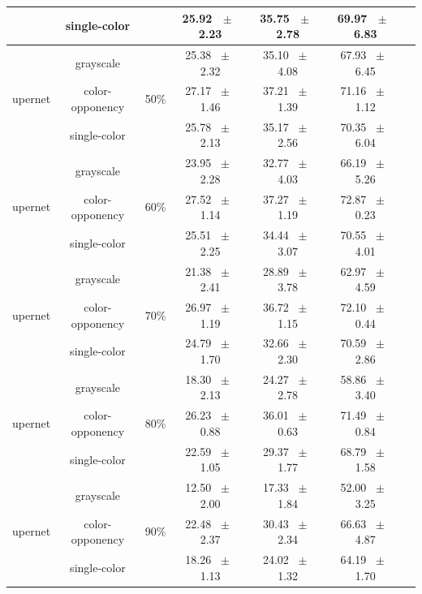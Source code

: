 \begin{table}[h]
\begin{tabular}{@{}lccc ccc@{}}
    & single-color &  & 25.92 ~$\pm$~ 2.23 & 35.75 ~$\pm$~ 2.78 & 69.97 ~$\pm$~ 6.83 \\
    \midrule
    \multirow{3}{*}{upernet} & grayscale & \multirow{3}{*}{50\%} & 25.38 ~$\pm$~ 2.32 & 35.10 ~$\pm$~ 4.08 & 67.93 ~$\pm$~ 6.45 \\
    & color-opponency &  & 27.17 ~$\pm$~ 1.46 & 37.21 ~$\pm$~ 1.39 & 71.16 ~$\pm$~ 1.12 \\
    & single-color &  & 25.78 ~$\pm$~ 2.13 & 35.17 ~$\pm$~ 2.56 & 70.35 ~$\pm$~ 6.04 \\
    \midrule
    \multirow{3}{*}{upernet} & grayscale & \multirow{3}{*}{60\%} & 23.95 ~$\pm$~ 2.28 & 32.77 ~$\pm$~ 4.03 & 66.19 ~$\pm$~ 5.26 \\
    & color-opponency &  & 27.52 ~$\pm$~ 1.14 & 37.27 ~$\pm$~ 1.19 & 72.87 ~$\pm$~ 0.23 \\
    & single-color &  & 25.51 ~$\pm$~ 2.25 & 34.44 ~$\pm$~ 3.07 & 70.55 ~$\pm$~ 4.01 \\
    \midrule
    \multirow{3}{*}{upernet} & grayscale & \multirow{3}{*}{70\%} & 21.38 ~$\pm$~ 2.41 & 28.89 ~$\pm$~ 3.78 & 62.97 ~$\pm$~ 4.59 \\
    & color-opponency &  & 26.97 ~$\pm$~ 1.19 & 36.72 ~$\pm$~ 1.15 & 72.10 ~$\pm$~ 0.44 \\
    & single-color &  & 24.79 ~$\pm$~ 1.70 & 32.66 ~$\pm$~ 2.30 & 70.59 ~$\pm$~ 2.86 \\
    \midrule
    \multirow{3}{*}{upernet} & grayscale & \multirow{3}{*}{80\%} & 18.30 ~$\pm$~ 2.13 & 24.27 ~$\pm$~ 2.78 & 58.86 ~$\pm$~ 3.40 \\
    & color-opponency &  & 26.23 ~$\pm$~ 0.88 & 36.01 ~$\pm$~ 0.63 & 71.49 ~$\pm$~ 0.84 \\
    & single-color &  & 22.59 ~$\pm$~ 1.05 & 29.37 ~$\pm$~ 1.77 & 68.79 ~$\pm$~ 1.58 \\
    \midrule
    \multirow{3}{*}{upernet} & grayscale & \multirow{3}{*}{90\%} & 12.50 ~$\pm$~ 2.00 & 17.33 ~$\pm$~ 1.84 & 52.00 ~$\pm$~ 3.25 \\
    & color-opponency &  & 22.48 ~$\pm$~ 2.37 & 30.43 ~$\pm$~ 2.34 & 66.63 ~$\pm$~ 4.87 \\
    & single-color &  & 18.26 ~$\pm$~ 1.13 & 24.02 ~$\pm$~ 1.32 & 64.19 ~$\pm$~ 1.70 \\
    \midrule
    \bottomrule
  \end{tabular}
  \label{tab:sparse_results_upernet_acdc_snow}
\end{table}